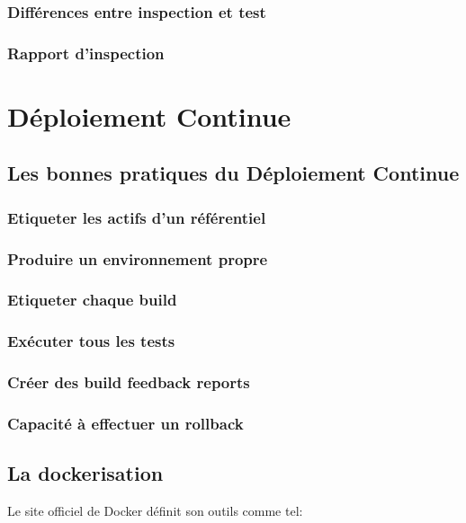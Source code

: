\documentclass{report}
\begin{document}
        \subsubsection{Différences entre inspection et test}

        \subsubsection{Rapport d’inspection}

    \section{Déploiement Continue}

      \subsection{Les bonnes pratiques du Déploiement Continue}

        \subsubsection{Etiqueter les actifs d’un référentiel}

        \subsubsection{Produire un environnement propre}

        \subsubsection{Etiqueter chaque build}

        \subsubsection{Exécuter tous les tests}

        \subsubsection{Créer des build feedback reports}

        \subsubsection{Capacité à effectuer un rollback}

      \subsection{La dockerisation}
      Le site officiel de Docker définit son outils comme tel:\\
\end{document}
